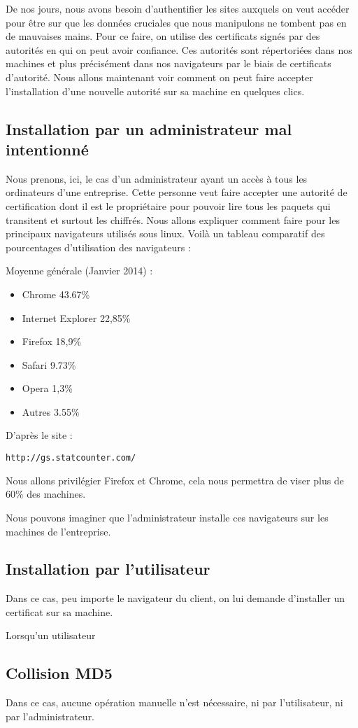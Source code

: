 De nos jours, nous avons besoin d'authentifier les sites auxquels on veut accéder pour être sur que les données cruciales que nous manipulons ne tombent pas en de mauvaises mains. Pour ce faire, on utilise des certificats signés par des autorités en qui on peut avoir confiance.
Ces autorités sont répertoriées dans nos machines et plus précisément dans nos navigateurs par le biais de certificats d'autorité.
Nous allons maintenant voir comment on peut faire accepter l'installation d'une nouvelle autorité sur sa machine en quelques clics.




\subsection{Installation par un administrateur mal intentionné}
Nous prenons, ici, le cas d'un administrateur ayant un accès à tous les ordinateurs d'une entreprise.
Cette personne veut faire accepter une autorité de certification dont il est le propriétaire pour pouvoir lire tous les paquets qui transitent et surtout les chiffrés.
Nous allons expliquer comment faire pour les principaux navigateurs utilisés sous linux.
Voilà un tableau comparatif des pourcentages d'utilisation des navigateurs : 

Moyenne générale (Janvier 2014) :
\begin{itemize}
\item{Chrome} 		43.67\%
\item{Internet Explorer}		 22,85\%
\item{Firefox} 		18,9\%
\item{Safari} 		9.73\%
\item{Opera}	 		1,3\%	
\item{Autres} 		3.55\%
\end{itemize}	


D'après le site : \begin{verbatim}
http://gs.statcounter.com/
\end{verbatim}

Nous allons privilégier Firefox et Chrome, cela nous permettra de viser plus de 60\% des machines.

Nous pouvons imaginer que l'administrateur installe ces navigateurs sur les machines de l'entreprise.
\newpage



\subsection{Installation par l'utilisateur}
Dans ce cas, peu importe le navigateur du client, on lui demande d'installer un certificat sur sa machine.

Lorsqu'un utilisateur


\subsection{Collision MD5}
Dans ce cas, aucune opération manuelle n'est nécessaire, ni par l'utilisateur, ni par l'administrateur.


